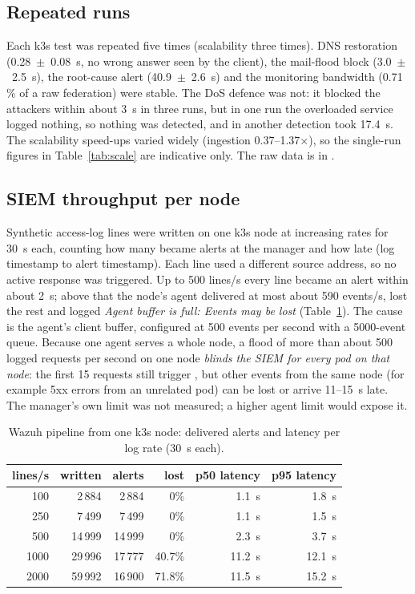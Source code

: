 \subsection{Repeated runs}
\label{sec:repeat}

Each k3s test was repeated five times (scalability three times). DNS restoration
(0.28~$\pm$~0.08~s, no wrong answer seen by the client), the mail-flood block (3.0~$\pm$~2.5~s), the
root-cause alert (40.9~$\pm$~2.6~s) and the monitoring bandwidth (0.71\,\% of a raw federation) were
stable. The DoS defence was not: it blocked the attackers within about 3~s in three runs, but in
one run the overloaded service logged nothing, so nothing was detected, and in another detection
took 17.4~s. The scalability speed-ups varied widely (ingestion 0.37--1.37$\times$), so the
single-run figures in Table~\ref{tab:scale} are indicative only. The raw data is in
.

\subsection{SIEM throughput per node}

Synthetic access-log lines were written on one k3s node at increasing rates for 30~s each, counting
how many became alerts at the manager and how late (log timestamp to alert timestamp). Each line
used a different source address, so no active response was triggered. Up to 500 lines/s every line
became an alert within about 2~s; above that the node's agent delivered at most about 590 events/s,
lost the rest and logged \emph{Agent buffer is full: Events may be lost}
(Table~\ref{tab:eps}). The cause is the agent's client buffer, configured at 500 events per second
with a 5000-event queue. Because one agent serves a whole node, a flood of more than about 500
logged requests per second on one node \emph{blinds the SIEM for every pod on that node}: the
first 15 requests still trigger , but other events from the same node (for example
5xx errors from an unrelated pod) can be lost or arrive 11--15~s late. The
manager's own limit was not measured; a higher agent limit would expose it.

\begin{table}[ht]
\centering\small
\caption{Wazuh pipeline from one k3s node: delivered alerts and latency per log rate (30~s each).}
\label{tab:eps}
\begin{tabular}{@{}rrrrrr@{}}
\toprule
lines/s & written & alerts & lost & p50 latency & p95 latency \\
\midrule
100  & 2\,884  & 2\,884  & 0\%    & 1.1~s  & 1.8~s \\
250  & 7\,499  & 7\,499  & 0\%    & 1.1~s  & 1.5~s \\
500  & 14\,999 & 14\,999 & 0\%    & 2.3~s  & 3.7~s \\
1000 & 29\,996 & 17\,777 & 40.7\% & 11.2~s & 12.1~s \\
2000 & 59\,992 & 16\,900 & 71.8\% & 11.5~s & 15.2~s \\
\bottomrule
\end{tabular}
\end{table}

